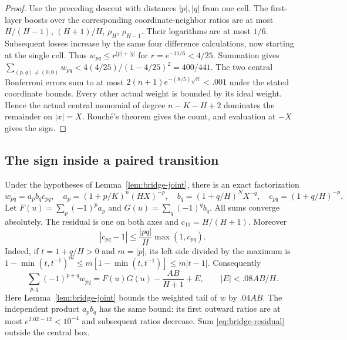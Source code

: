 \begin{proof}
Use the preceding descent with distances $|p|,|q|$ from one cell.
The first-layer boosts over the corresponding coordinate-neighbor
ratios are at most $H/(H-1)$, $(H+1)/H$, $\rho_H$, $\rho_{H-1}$.
Their logarithms are at most $1/6$. Subsequent losses increase by the
same four difference calculations, now starting at the single cell.
Thus $w_{pq}\le r^{|p|+|q|}$ for $r=e^{-11/6}<4/25$. Summation gives
$\sum_{(p,q)\ne(0,0)}w_{pq}<4(4/25)/(1-4/25)^2=400/441$.
The two central Bonferroni errors sum to at most
$2(n+1)e^{-(8/5)\sqrt n}<.001$ under the stated coordinate bounds.
Every other actual weight is bounded by its ideal weight. Hence the
actual central monomial of degree $n-K-H+2$ dominates the remainder
on $|x|=X$. Rouch\'e's theorem gives the count, and evaluation at $-X$
gives the sign.
\end{proof}

\subsection{The sign inside a paired transition}

Under the hypotheses of Lemma~\ref{lem:bridge-joint}, there is an exact factorization
\[
 w_{pq}=a_pb_qc_{pq},\quad
 a_p=(1+p/K)^n(HX)^{-p},\quad
 b_q=(1+q/H)^NX^{-q},\quad c_{pq}=(1+q/H)^{-p}.
\]
Let $F(u)=\sum_p(-1)^pa_p$ and $G(u)=\sum_q(-1)^qb_q$.
All sums converge absolutely. The residual is one on both axes and
$c_{11}=H/(H+1)$. Moreover
\begin{equation}\label{eq:bridge-residual}
 |c_{pq}-1|\le\frac{|pq|}{H}\max(1,c_{pq}).
\end{equation}
Indeed, if $t=1+q/H>0$ and $m=|p|$, its left side divided by the
maximum is $1-\min(t,t^{-1})^m\le m[1-\min(t,t^{-1})]\le m|t-1|$.
Consequently
\begin{equation}\label{eq:bridge-product}
 \sum_{p,q}(-1)^{p+q}w_{pq}
 =F(u)G(u)-\frac{AB}{H+1}+E,\qquad |E|<.08AB/H.
\end{equation}
Here Lemma~\ref{lem:bridge-joint} bounds the weighted tail of $w$ by
$.04AB$. The independent product $a_pb_q$ has the same bound: its
first outward ratios are at most $e^{2.02-12}<10^{-4}$ and subsequent
ratios decrease. Sum \eqref{eq:bridge-residual} outside the central box.

